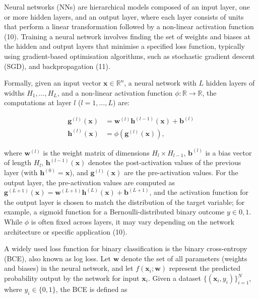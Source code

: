 \documentclass[
  a4paper,
]{scrreprt}
\begin{document}
Neural networks (NNs) are hierarchical models composed of an input
layer, one or more hidden layers, and an output layer, where each layer
consists of units that perform a linear transformation followed by a
non-linear activation function (10). Training a neural network involves
finding the set of weights and biases at the hidden and output layers
that minimise a specified loss function, typically using gradient-based
optimisation algorithms, such as stochastic gradient descent (SGD), and
backpropagation (11).

Formally, given an input vector \(\mathbf{x} \in \mathbb{R}^n\), a
neural network with \(L\) hidden layers of widths \(H_1, \dots, H_L\),
and a non-linear activation function
\(\phi: \mathbb{R} \rightarrow \mathbb{R}\), the computations at layer
\(l\) (\(l = 1, \dots, L\)) are:

\[
\begin{aligned}
\mathbf{g}^{(l)}(\mathbf{x}) &= \mathbf{w}^{(l)} \mathbf{h}^{(l-1)}(\mathbf{x}) + \mathbf{b}^{(l)} \\
\mathbf{h}^{(l)}(\mathbf{x}) &= \phi\left(\mathbf{g}^{(l)}(\mathbf{x})\right),
\end{aligned}
\]

where \(\mathbf{w}^{(l)}\) is the weight matrix of dimensions
\(H_l \times H_{l-1}\), \(\mathbf{b}^{(l)}\) is a bias vector of length
\(H_l\), \(\mathbf{h}^{(l-1)}(\mathbf{x})\) denotes the post-activation
values of the previous layer (with \(\mathbf{h}^{(0)} = \mathbf{x}\)),
and \(\mathbf{g}^{(l)}(\mathbf{x})\) are the pre-activation values. For
the output layer, the pre-activation values are computed as
\(\mathbf{g}^{(L+1)}(\mathbf{x}) = \mathbf{w}^{(L+1)} \mathbf{h}^{(L)}(\mathbf{x}) + \mathbf{b}^{(L+1)}\),
and the activation function for the output layer is chosen to match the
distribution of the target variable; for example, a sigmoid function for
a Bernoulli-distributed binary outcome \(y \in {0,1}\). While \(\phi\)
is often fixed across layers, it may vary depending on the network
architecture or specific application (10).

A widely used loss function for binary classification is the binary
cross-entropy (BCE), also known as log loss. Let \(\mathbf{w}\) denote
the set of all parameters (weights and biases) in the neural network,
and let \(f(\mathbf{x}_i; \mathbf{w})\) represent the predicted
probability output by the network for input \(\mathbf{x}_i\). Given a
dataset \(\{(\mathbf{x}_i, y_i)\}_{i=1}^N\), where \(y_i \in \{0,1\}\),
the BCE is defined as
\end{document}
